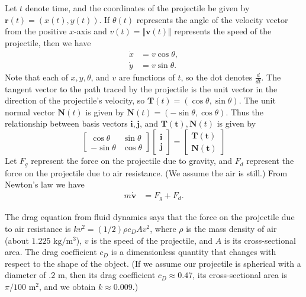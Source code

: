 Let \(t\) denote time, and the coordinates of the projectile be given by $\mathbf{r}(t) = (x(t), y(t))$.
If $\theta(t)$ represents the angle of the velocity vector from the positive $x$-axis and \(v(t)=\Vert\mathbf{v}(t) \Vert\) represents the speed of the projectile, then we have
\begin{align*}
\dot{x} &= v\cos{\theta},\\
\dot{y} &= v\sin{\theta}.
\end{align*}
Note that each of $x,y,\theta$, and $v$ are functions of $t$, so the dot denotes $\frac{d}{dt}$.
The tangent vector to the path traced by the projectile is the unit vector in the direction of the projectile's velocity, so $\mathbf{T}(t) = ( \cos{\theta}, \sin{\theta} )$.
The unit normal vector $\mathbf{N} (t)$ is given by $\mathbf{N} (t)= ( -\sin{\theta}, \cos{\theta} )$.
Thus the relationship between basis vectors $\mathbf{i}, \mathbf{j}$, and $\mathbf{T(t)}, \mathbf{N}(t)$ is given by
\[
\left[\begin{array}{cc}
\cos{\theta} & \sin{\theta} \\
-\sin{\theta} & \cos{\theta}\end{array}\right]
\left[\begin{array}{c}
\mathbf{i} \\
\mathbf{j}
\end{array}\right]
=
\left[\begin{array}{c}
\mathbf{T(t)} \\
\mathbf{N(t)}
\end{array}\right]\]
Let $F_g$ represent the force on the projectile due to gravity, and $F_d$ represent the force on the projectile due to air resistance. (We assume the air is still.)
From Newton's law we have
\begin{align*}
m \dot{\mathbf{v}} &= F_g + F_d.
\end{align*}

The drag equation from fluid dynamics says that the force on the projectile due to air resistance is $k v^2 = (1/2)\rho c_D A v^2$, where $\rho$ is the mass density of air (about $1.225$ $\text{kg}/\text{m}^3$), $v$ is the speed of the projectile, and $A$ is its cross-sectional area.
The drag coefficient $c_D$ is a dimensionless quantity that changes with respect to the shape of the object.
(If we assume our projectile is spherical with a diameter of $.2$ m, then its drag coefficient $c_D \approx 0.47$, its cross-sectional area is $\pi/100$ $ \text{m}^2$, and we obtain $k \approx 0.009$.)

